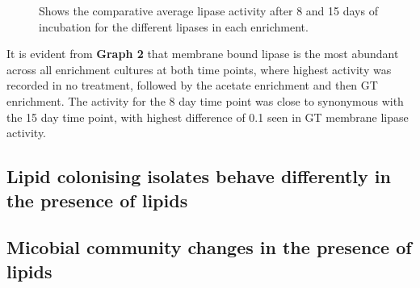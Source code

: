 \documentclass[11pt]{article}
\begin{document}
\begin{figure}
\caption{Shows the comparative average lipase activity after 8 and 15 days of incubation for the different lipases in each enrichment.}
\end{figure}


It is evident from  \textbf{Graph 2} that membrane bound lipase is the most abundant across all enrichment cultures at both time points, where highest activity was recorded in no treatment, followed by the acetate enrichment and then GT enrichment.  The activity for the 8 day time point was close to synonymous with the 15 day time point, with highest difference of 0.1 seen in GT membrane lipase activity.

\subsection{Lipid colonising isolates behave differently in the presence of lipids}

\subsection{Micobial community changes in the presence of lipids}
\end{document}
